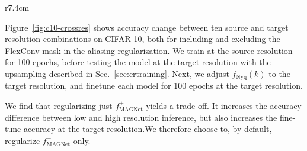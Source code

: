 \documentclass{article} \usepackage{iclr2022_conference,times}
\begin{document}
\setlength\intextsep{0pt}
\begin{wraptable}{r}{7.4cm}
\centering
\caption{Alias-free FlexNets on CIFAR-10.}
\label{tab:crossres}
\vspace{-5mm}
\begin{center}
\end{center}
\vspace{-2mm}
\end{wraptable}

Figure~\ref{fig:c10-crossres} shows accuracy change between ten source and target resolution combinations on CIFAR-10, both for including and excluding the FlexConv mask in the aliasing regularization. We train at the source resolution for 100 epochs, before testing the model at the target resolution with the upsampling described in Sec.~\ref{sec:crtraining}. Next, we adjust $f_{\textrm{Nyq}}(k)$ to the target resolution, and finetune each model for 100 epochs at the target resolution.

We find that regularizing just $f^+_{\textrm{MAGNet}}$ yields a trade-off. It increases the accuracy difference between low and high resolution inference, but also increases the fine-tune accuracy at the target resolution.We therefore choose to, by default, regularize $f^+_{\textrm{MAGNet}}$ only.
\end{document}
